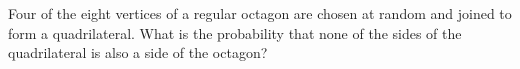 Four of the eight vertices of a regular octagon are chosen at random and joined to form a quadrilateral. What is the probability that none of the sides of the quadrilateral is also a side of the octagon?

